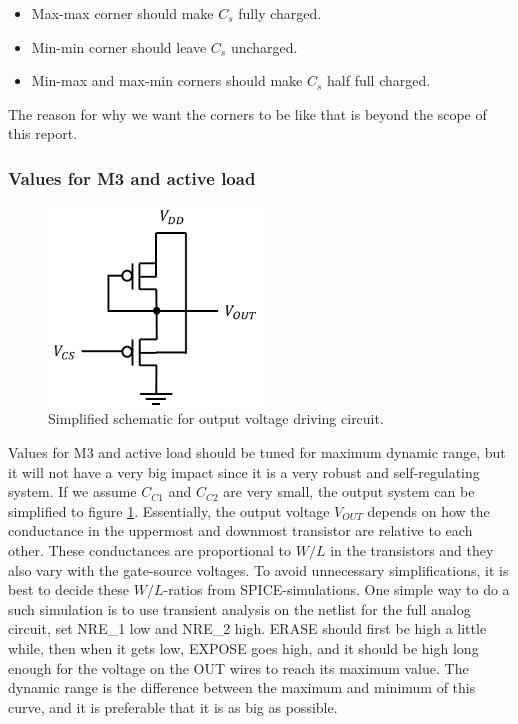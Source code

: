 \begin{itemize}
    \item Max-max corner should make $C_s$ fully charged.
    \item Min-min corner should leave $C_s$ uncharged.
    \item Min-max and max-min corners should make $C_s$ half full charged.
\end{itemize}

The reason for why we want the corners to be like that is beyond the scope of this report.

\subsubsection{Values for M3 and active load}

\begin{figure}[H]
    \centering
    \includegraphics[width=0.5\textwidth]{graphs/m3AndActiveLoad.png}
    \caption{Simplified schematic for output voltage driving circuit.}
    \label{fig:m3AndActiveLoad}
\end{figure}

Values for M3 and active load should be tuned for maximum dynamic range, but it will not have a very big impact since it is a very robust and self-regulating system. If we assume $C_{C1}$ and $C_{C2}$ are very small, the output system can be simplified to figure \ref{fig:m3AndActiveLoad}. Essentially, the output voltage $V_{OUT}$ depends on how the conductance in the uppermost and downmost transistor are relative to each other. These conductances are proportional to $W/L$ in the transistors and they also vary with the gate-source voltages. To avoid unnecessary simplifications, it is best to decide these $W/L$-ratios from SPICE-simulations. One simple way to do a such simulation is to use transient analysis on the netlist for the full analog circuit, set NRE\_1 low and NRE\_2 high. ERASE should first be high a little while, then when it gets low, EXPOSE goes high, and it should be high long enough for the voltage on the OUT wires to reach its maximum value. The dynamic range is the difference between the maximum and minimum of this curve, and it is preferable that it is as big as possible.

